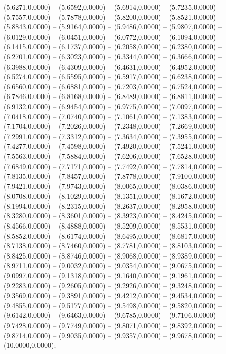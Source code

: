 (5.6271,0.0000) -- (5.6592,0.0000) -- (5.6914,0.0000) -- (5.7235,0.0000) -- (5.7557,0.0000) -- (5.7878,0.0000) -- (5.8200,0.0000) -- (5.8521,0.0000) -- (5.8843,0.0000) -- (5.9164,0.0000) -- (5.9486,0.0000) -- (5.9807,0.0000) -- (6.0129,0.0000) -- (6.0451,0.0000) -- (6.0772,0.0000) -- (6.1094,0.0000) -- (6.1415,0.0000) -- (6.1737,0.0000) -- (6.2058,0.0000) -- (6.2380,0.0000) -- (6.2701,0.0000) -- (6.3023,0.0000) -- (6.3344,0.0000) -- (6.3666,0.0000) -- (6.3988,0.0000) -- (6.4309,0.0000) -- (6.4631,0.0000) -- (6.4952,0.0000) -- (6.5274,0.0000) -- (6.5595,0.0000) -- (6.5917,0.0000) -- (6.6238,0.0000) -- (6.6560,0.0000) -- (6.6881,0.0000) -- (6.7203,0.0000) -- (6.7524,0.0000) -- (6.7846,0.0000) -- (6.8168,0.0000) -- (6.8489,0.0000) -- (6.8811,0.0000) -- (6.9132,0.0000) -- (6.9454,0.0000) -- (6.9775,0.0000) -- (7.0097,0.0000) -- (7.0418,0.0000) -- (7.0740,0.0000) -- (7.1061,0.0000) -- (7.1383,0.0000) -- (7.1704,0.0000) -- (7.2026,0.0000) -- (7.2348,0.0000) -- (7.2669,0.0000) -- (7.2991,0.0000) -- (7.3312,0.0000) -- (7.3634,0.0000) -- (7.3955,0.0000) -- (7.4277,0.0000) -- (7.4598,0.0000) -- (7.4920,0.0000) -- (7.5241,0.0000) -- (7.5563,0.0000) -- (7.5884,0.0000) -- (7.6206,0.0000) -- (7.6528,0.0000) -- (7.6849,0.0000) -- (7.7171,0.0000) -- (7.7492,0.0000) -- (7.7814,0.0000) -- (7.8135,0.0000) -- (7.8457,0.0000) -- (7.8778,0.0000) -- (7.9100,0.0000) -- (7.9421,0.0000) -- (7.9743,0.0000) -- (8.0065,0.0000) -- (8.0386,0.0000) -- (8.0708,0.0000) -- (8.1029,0.0000) -- (8.1351,0.0000) -- (8.1672,0.0000) -- (8.1994,0.0000) -- (8.2315,0.0000) -- (8.2637,0.0000) -- (8.2958,0.0000) -- (8.3280,0.0000) -- (8.3601,0.0000) -- (8.3923,0.0000) -- (8.4245,0.0000) -- (8.4566,0.0000) -- (8.4888,0.0000) -- (8.5209,0.0000) -- (8.5531,0.0000) -- (8.5852,0.0000) -- (8.6174,0.0000) -- (8.6495,0.0000) -- (8.6817,0.0000) -- (8.7138,0.0000) -- (8.7460,0.0000) -- (8.7781,0.0000) -- (8.8103,0.0000) -- (8.8425,0.0000) -- (8.8746,0.0000) -- (8.9068,0.0000) -- (8.9389,0.0000) -- (8.9711,0.0000) -- (9.0032,0.0000) -- (9.0354,0.0000) -- (9.0675,0.0000) -- (9.0997,0.0000) -- (9.1318,0.0000) -- (9.1640,0.0000) -- (9.1961,0.0000) -- (9.2283,0.0000) -- (9.2605,0.0000) -- (9.2926,0.0000) -- (9.3248,0.0000) -- (9.3569,0.0000) -- (9.3891,0.0000) -- (9.4212,0.0000) -- (9.4534,0.0000) -- (9.4855,0.0000) -- (9.5177,0.0000) -- (9.5498,0.0000) -- (9.5820,0.0000) -- (9.6142,0.0000) -- (9.6463,0.0000) -- (9.6785,0.0000) -- (9.7106,0.0000) -- (9.7428,0.0000) -- (9.7749,0.0000) -- (9.8071,0.0000) -- (9.8392,0.0000) -- (9.8714,0.0000) -- (9.9035,0.0000) -- (9.9357,0.0000) -- (9.9678,0.0000) -- (10.0000,0.0000);

